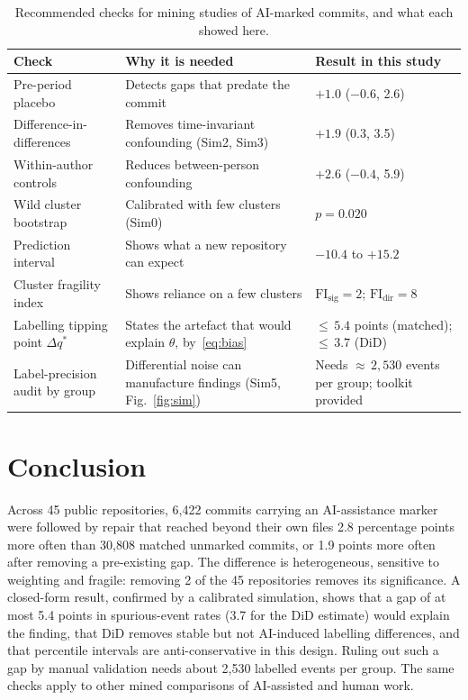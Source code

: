 \documentclass[runningheads]{llncs}
\begin{document}
\begin{table}[!tb]
\caption{Recommended checks for mining studies of AI-marked commits, and what each showed here.}\label{tab:checks}
\centering\footnotesize
\setlength{\tabcolsep}{4pt}
\begin{tabularx}{\textwidth}{@{}>{\raggedright\arraybackslash}p{}>{\raggedright\arraybackslash}X>{\raggedright\arraybackslash}p{}@{}}
\toprule
Check & Why it is needed & Result in this study \\
\midrule
Pre-period placebo & Detects gaps that predate the commit & $+1.0$ ($-0.6$, 2.6) \\
Difference-in-differences & Removes time-invariant confounding (Sim2, Sim3) & $+1.9$ (0.3, 3.5) \\
Within-author controls & Reduces between-person confounding & $+2.6$ ($-0.4$, 5.9) \\
Wild cluster bootstrap & Calibrated with few clusters (Sim0) & $p = 0.020$ \\
Prediction interval & Shows what a new repository can expect & $-10.4$ to $+15.2$ \\
Cluster fragility index & Shows reliance on a few clusters & $\mathrm{FI}_{\mathrm{sig}} = 2$; $\mathrm{FI}_{\mathrm{dir}} = 8$ \\
Labelling tipping point $\Delta q^{*}$ & States the artefact that would explain $\theta$, by~\eqref{eq:bias} & ${\le}\,5.4$ points (matched); ${\le}\,3.7$ (DiD) \\
Label-precision audit by group & Differential noise can manufacture findings (Sim5, Fig.~\ref{fig:sim}) & Needs ${\approx}\,2{,}530$ events per group; toolkit provided \\
\bottomrule
\end{tabularx}
\end{table}

\section{Conclusion}

Across 45 public repositories, 6,422 commits carrying an AI-assistance marker were followed by repair that reached beyond their own files 2.8 percentage points more often than 30,808 matched unmarked commits, or 1.9 points more often after removing a pre-existing gap. The difference is heterogeneous, sensitive to weighting and fragile: removing 2 of the 45 repositories removes its significance. A closed-form result, confirmed by a calibrated simulation, shows that a gap of at most 5.4 points in spurious-event rates (3.7 for the DiD estimate) would explain the finding, that DiD removes stable but not AI-induced labelling differences, and that percentile intervals are anti-conservative in this design. Ruling out such a gap by manual validation needs about 2,530 labelled events per group. The same checks apply to other mined comparisons of AI-assisted and human work.
\end{document}
